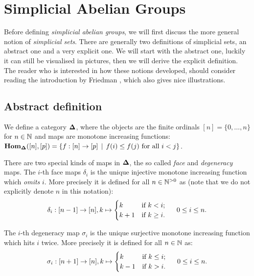 \section{Simplicial Abelian Groups}
\label{sec:Simplicial Abelian Groups}

Before defining \emph{simplicial abelian groups}, we will first discuss the more general notion of \emph{simplicial sets}. There are generally two definitions of simplicial sets, an abstract one and a very explicit one. We will start with the abstract one, luckily it can still be visualised in pictures, then we will derive the explicit definition. The reader who is interested in how these notions developed, should consider reading the introduction by Friedman \cite{friedman}, which also gives nice illustrations.

\subsection{Abstract definition}
\begin{definition}
	We define a category $\mathbf{\Delta}$, where the objects are the finite ordinals $[n] = \{0, \dots, n\}$ for $n \in \mathbb{N}$ and maps are monotone increasing functions: $\mathbf{Hom}_{\mathbf{\Delta}}([n], [p]) = \{ f : [n] \to [p] \,\mid\, f(i) \leq f(j) \text{ for all } i < j \}$.
\end{definition}

There are two special kinds of maps in $\mathbf{\Delta}$, the so called \emph{face} and \emph{degeneracy} maps. The $i$-th face maps $\delta_i$ is the unique injective monotone increasing function which \emph{omits} $i$. More precisely it is defined for all $n \in {\mathbb{N}^{>0}}$ as (note that we do not explicitly denote $n$ in this notation):
$$ \delta_i: [n-1] \to [n], k \mapsto \begin{cases} k & \text{if } k < i;\\ k+1 & \text{if } k \geq i. \end{cases} \hspace{0.5cm} 0 \leq i \leq n. $$

The $i$-th degeneracy map $\sigma_i$ is the unique surjective monotone increasing function which hits $i$ twice. More precisely it is defined for all $n \in \mathbb{N}$ as:
$$ \sigma_i: [n+1] \to [n], k \mapsto \begin{cases} k & \text{if } k \leq i;\\ k-1 & \text{if } k > i. \end{cases} \hspace{0.5cm} 0 \leq i \leq n. $$

